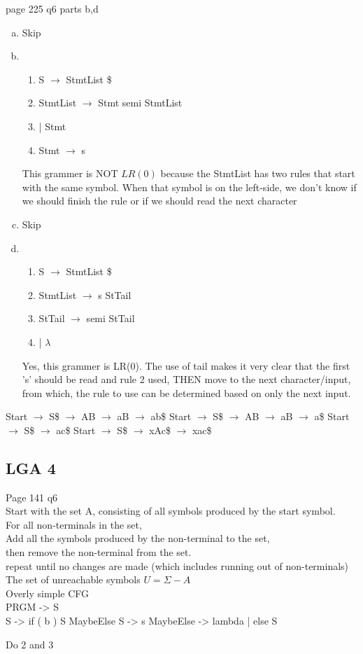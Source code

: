 \documentclass[11pt]{article}
\begin{document}
    page 225 q6 parts b,d
    \begin{enumerate}[(a)]
        \item Skip
        \item
            \begin{enumerate}
                \item S $\to$ StmtList \$
                \item StmtList $\to$ Stmt semi StmtList
                \item   | Stmt
                \item Stmt $\to$ s
            \end{enumerate}
            This grammer is NOT $LR(0)$ because the StmtList has two rules that
            start with the same symbol. When that symbol is on the left-side, we
            don't know if we should finish the rule or if we should read the next character
        \item Skip
        \item
            \begin{enumerate}
                \item S $\to$ StmtList \$
                \item StmtList $\to$ s StTail
                \item StTail $\to$ semi StTail
                \item   | $\lambda$
            \end{enumerate}
            Yes, this grammer is LR(0). The use of tail makes it very clear that
            the first 's' should be read and rule 2 used, THEN move to the next
            character/input, from which, the rule to use can be determined based
            on only the next input.
    \end{enumerate}

    Start $\to$ S\$ $\to$ AB $\to$ aB $\to$ ab\$
    Start $\to$ S\$ $\to$ AB $\to$ aB $\to$ a\$
    Start $\to$ S\$ $\to$ ac\$
    Start $\to$ S\$ $\to$ xAc\$ $\to$ xac\$

    \subsection{LGA 4}
    Page 141 q6 \\
    Start with the set A, consisting of all symbols produced by the start symbol. \\
    For all non-terminals in the set, \\
        Add all the symbols produced by the non-terminal to the set, \\
        then remove the non-terminal from the set. \\
    repeat until no changes are made (which includes running out of non-terminals) \\
    The set of unreachable symbols $U = \Sigma - A$ \\

    Overly simple CFG \\
    PRGM -> S \\
    S -> if ( b ) S MaybeElse
    S -> s
    MaybeElse -> lambda
              | else S

    Do 2 and 3
\end{document}
